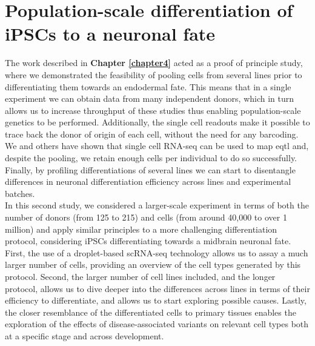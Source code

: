 
\chapter{Population-scale differentiation of iPSCs to a neuronal fate}
\label{chapter5}

The work described in \textbf{Chapter 
\ref{chapter4}}
acted as a proof of principle study, where we demonstrated the feasibility of pooling cells from several lines prior to differentiating them towards an endodermal fate.
This means that in a single experiment we can obtain data from many independent donors, which in turn allows us to increase throughput of these studies thus enabling population-scale genetics to be performed.
Additionally, the single cell readouts make it possible to trace back the donor of origin of each cell, without the need for any barcoding.
We and others have shown that single cell RNA-seq can be used to map \gls{eqtl} and, despite the pooling, we retain enough cells per individual to do so successfully.
Finally, by profiling differentiations of several lines we can start to disentangle differences in neuronal differentiation efficiency across lines and experimental batches. \\

In this second study, we considered a larger-scale experiment in terms of both the number of donors (from 125 to 215) and cells (from around 40,000 to over 1 million) and apply similar principles to a more challenging differentiation protocol, considering iPSCs differentiating towards a midbrain neuronal fate.
First, the use of a droplet-based scRNA-seq technology allows us to assay a much larger number of cells, providing an overview of the 
cell types generated by this protocol. 
Second, the larger number of cell lines included, and the longer protocol, allows us to dive deeper into the differences across lines in terms of their efficiency to differentiate, and allows us to start exploring possible causes.
Lastly, the closer resemblance of the differentiated cells to primary tissues enables the exploration of the effects of disease-associated variants on relevant cell types both at a specific stage and across development. 

